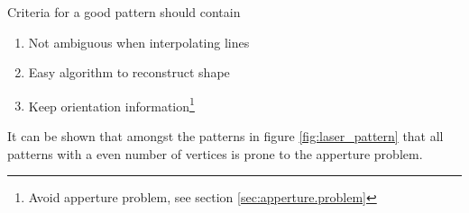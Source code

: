 Criteria for a good pattern should contain
\begin{enumerate}
	\item Not ambiguous when interpolating lines
	\item Easy algorithm to reconstruct shape
	\item Keep orientation information\footnote{Avoid apperture problem, see section \vref{sec:apperture.problem}}
\end{enumerate}

It can be shown that amongst the patterns in figure \vref{fig:laser_pattern} that all patterns with a even number 
of vertices is prone to the apperture problem. 
